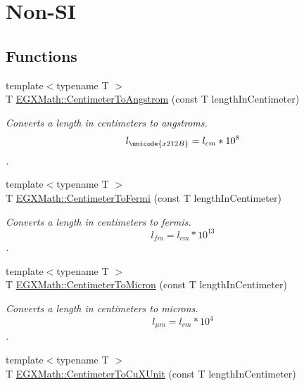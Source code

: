 \hypertarget{group___e_g_x_math-_conversions-_length_conversions-_s_i-_centimeter-_non-_s_i}{}\section{Non-\/\+SI}
\label{group___e_g_x_math-_conversions-_length_conversions-_s_i-_centimeter-_non-_s_i}
\subsection*{Functions}
\begin{DoxyCompactItemize}
\item 
{\footnotesize template$<$typename T $>$ }\\T \mbox{\hyperlink{group___e_g_x_math-_conversions-_length_conversions-_s_i-_centimeter-_non-_s_i_gacabf2b01cd8676ffb5ec8c70ecd621b6}{E\+G\+X\+Math\+::\+Centimeter\+To\+Angstrom}} (const T length\+In\+Centimeter)
\begin{DoxyCompactList}\small\item\em Converts a length in centimeters to angstroms. \[ l_{\unicode{x212B}}=l_{cm} * 10^{8} \]. \end{DoxyCompactList}\item 
{\footnotesize template$<$typename T $>$ }\\T \mbox{\hyperlink{group___e_g_x_math-_conversions-_length_conversions-_s_i-_centimeter-_non-_s_i_ga0b55e847f11e0ba8313d4556d23684dd}{E\+G\+X\+Math\+::\+Centimeter\+To\+Fermi}} (const T length\+In\+Centimeter)
\begin{DoxyCompactList}\small\item\em Converts a length in centimeters to fermis. \[ l_{fm}=l_{cm} * 10^{13} \]. \end{DoxyCompactList}\item 
{\footnotesize template$<$typename T $>$ }\\T \mbox{\hyperlink{group___e_g_x_math-_conversions-_length_conversions-_s_i-_centimeter-_non-_s_i_gaee509ac676e86ed54994792f82dab9f7}{E\+G\+X\+Math\+::\+Centimeter\+To\+Micron}} (const T length\+In\+Centimeter)
\begin{DoxyCompactList}\small\item\em Converts a length in centimeters to microns. \[ l_{\mu m}=l_{cm} * 10^{4} \]. \end{DoxyCompactList}\item 
{\footnotesize template$<$typename T $>$ }\\T \mbox{\hyperlink{group___e_g_x_math-_conversions-_length_conversions-_s_i-_centimeter-_non-_s_i_ga98d44269c80a1c5ab7c38d27aba39517}{E\+G\+X\+Math\+::\+Centimeter\+To\+Cu\+X\+Unit}} (const T length\+In\+Centimeter)

\end{DoxyCompactItemize}

